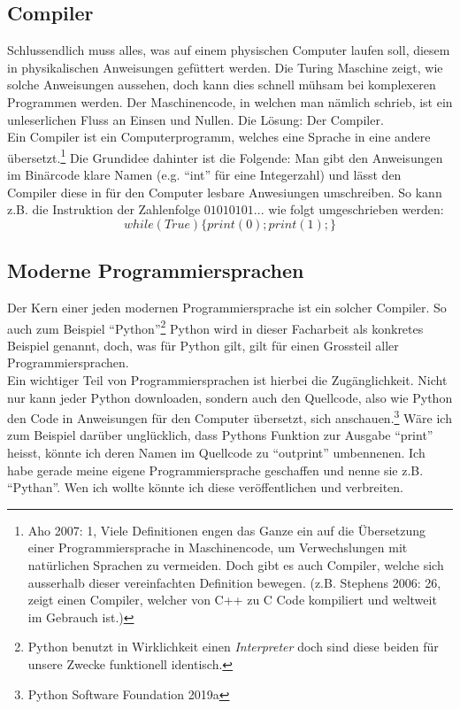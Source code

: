 \documentclass[a4paper,10pt]{article}
\begin{document}
\subsection{Compiler}
Schlussendlich muss alles, was auf einem physischen Computer laufen soll, diesem in physikalischen Anweisungen gefüttert werden. Die Turing Maschine zeigt, wie solche Anweisungen aussehen, doch kann dies schnell mühsam bei komplexeren Programmen werden. Der Maschinencode, in welchen man nämlich schrieb, ist ein unleserlichen Fluss an Einsen und Nullen. Die Lösung: Der Compiler. \\
Ein Compiler ist ein Computerprogramm, welches eine Sprache in eine andere übersetzt.\footnote{Aho 2007: 1, Viele Definitionen engen das Ganze ein auf die Übersetzung einer Programmiersprache in Maschinencode, um Verwechslungen mit natürlichen Sprachen zu vermeiden. Doch gibt es auch Compiler, welche sich ausserhalb dieser vereinfachten Definition bewegen. (z.B. Stephens 2006: 26, zeigt einen Compiler, welcher von C++ zu C Code kompiliert und weltweit im Gebrauch ist.)} Die Grundidee dahinter ist die Folgende: Man gibt den Anweisungen im Binärcode klare Namen (e.g. \enquote{int} für eine Integerzahl) und lässt den Compiler diese in für den Computer lesbare Anwesiungen umschreiben. So kann z.B. die Instruktion der Zahlenfolge $01010101...$ wie folgt umgeschrieben werden: 
$$ while (True) \{ print(0); print(1);\} $$

\subsection{Moderne Programmiersprachen}
Der Kern einer jeden modernen Programmiersprache ist ein solcher Compiler. So auch zum Beispiel \enquote{Python}\footnote{Python benutzt in Wirklichkeit einen \textit{Interpreter} doch sind diese beiden für unsere Zwecke funktionell identisch.} Python wird in dieser Facharbeit als konkretes Beispiel genannt, doch, was für Python gilt, gilt für einen Grossteil aller Programmiersprachen.\\
Ein wichtiger Teil von Programmiersprachen ist hierbei die Zugänglichkeit. Nicht nur kann jeder Python downloaden, sondern auch den Quellcode, also wie Python den Code in Anweisungen für den Computer übersetzt, sich anschauen.\footnote{Python Software Foundation 2019a} Wäre ich zum Beispiel darüber unglücklich, dass Pythons Funktion zur Ausgabe \enquote{print} heisst, könnte ich deren Namen im Quellcode zu \enquote{outprint} umbennenen. Ich habe gerade meine eigene Programmiersprache geschaffen und nenne sie z.B. \enquote{Pythan}. Wen ich wollte könnte ich diese veröffentlichen und verbreiten.
\end{document}
